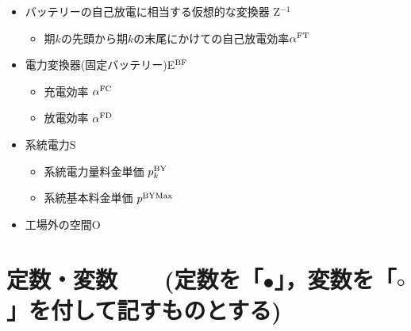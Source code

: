 \documentclass{jarticle}
\newcommand{\IB}{$\bullet$}
\newcommand{\IC}{$\circ$}
\newcommand{\IS}{$*$}
\begin{document}
\begin{itemize}
  \begin{itemize}
   \item[\IB] 変換効率 $\alpha^{\rm DD}$
  \end{itemize} 
 \item[\IS] バッテリーの自己放電に相当する仮想的な変換器 Z$^{ -1}$
  \begin{itemize}
   \item[\IB] 期$k$の先頭から期$k$の末尾にかけての自己放電効率$\alpha^{\rm FT}$
  \end{itemize}
 \item[\IS] 電力変換器(固定バッテリー)E$^{\rm BF}$
  \begin{itemize}
   \item[\IB] 充電効率 $\alpha^{\rm FC}$
   \item[\IB] 放電効率 $\alpha^{\rm FD}$
  \end{itemize}
 \item[\IS] 系統電力S
   \begin{itemize}
   \item[\IB] 系統電力量料金単価 $p^{\rm BY}_{k}$
   \item[\IB] 系統基本料金単価 $p^{\rm BYMax}$
  \end{itemize}
 \item[\IS] 工場外の空間O
\end{itemize}


\section{定数・変数 \mbox{\normalsize\rm 
~ (定数を「\IB」，変数を「\IC」を付して記すものとする)}}
\end{document}
